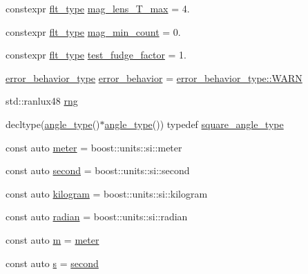\begin{DoxyCompactItemize}
\item 
constexpr \hyperlink{lib_2IceBRG__main_2common_8h_ad0f130a56eeb944d9ef2692ee881ecc4}{flt\+\_\+type} \hyperlink{namespaceIceBRG_a2396686715e28d2b62baac2dfb9021a9}{mag\+\_\+lens\+\_\+\+T\+\_\+max} = 4.
\item 
constexpr \hyperlink{lib_2IceBRG__main_2common_8h_ad0f130a56eeb944d9ef2692ee881ecc4}{flt\+\_\+type} \hyperlink{namespaceIceBRG_a64cda385b1f9579a049d1d58d0844611}{mag\+\_\+min\+\_\+count} = 0.
\item 
constexpr \hyperlink{lib_2IceBRG__main_2common_8h_ad0f130a56eeb944d9ef2692ee881ecc4}{flt\+\_\+type} \hyperlink{namespaceIceBRG_ada4d38aafd54f8dff69cf92960cfa2a9}{test\+\_\+fudge\+\_\+factor} = 1.
\item 
\hyperlink{namespaceIceBRG_afc0a41c01ba37ad05cd3032371417832}{error\+\_\+behavior\+\_\+type} \hyperlink{namespaceIceBRG_a7c664338d0bd76bc09ed343d7478e65f}{error\+\_\+behavior} = \hyperlink{namespaceIceBRG_afc0a41c01ba37ad05cd3032371417832a32bd8a1db2275458673903bdb84cb277}{error\+\_\+behavior\+\_\+type\+::\+W\+A\+R\+N}
\item 
std\+::ranlux48 \hyperlink{namespaceIceBRG_a43349d2fe56e49b46f2da45c2472137d}{rng}
\item 
decltype(\hyperlink{namespaceIceBRG_a688eeb0811a2474b20b667ed2e9625a1}{angle\+\_\+type}()$\ast$\hyperlink{namespaceIceBRG_a688eeb0811a2474b20b667ed2e9625a1}{angle\+\_\+type}()) typedef \hyperlink{namespaceIceBRG_af4db0ce6eb1c82d5b5bc58d9467676ea}{square\+\_\+angle\+\_\+type}
\item 
const auto \hyperlink{namespaceIceBRG_aa73b527a69b3a11b2dcb1d5c1b1d5ef1}{meter} = boost\+::units\+::si\+::meter
\item 
const auto \hyperlink{namespaceIceBRG_a542d4177a57d87415daf841cf88e6b15}{second} = boost\+::units\+::si\+::second
\item 
const auto \hyperlink{namespaceIceBRG_aaf220eb7f44e1dc31c74784c7e1ff646}{kilogram} = boost\+::units\+::si\+::kilogram
\item 
const auto \hyperlink{namespaceIceBRG_af78fec3f42ee23d596793328b8991468}{radian} = boost\+::units\+::si\+::radian
\item 
const auto \hyperlink{namespaceIceBRG_ada6365c5d16106f0608afbd34f010bcc}{m} = \hyperlink{namespaceIceBRG_aa73b527a69b3a11b2dcb1d5c1b1d5ef1}{meter}
\item 
const auto \hyperlink{namespaceIceBRG_ad0b9ada1ad5ccc9d88c2050483109e06}{s} = \hyperlink{namespaceIceBRG_a542d4177a57d87415daf841cf88e6b15}{second}
\item 

\end{DoxyCompactItemize}
